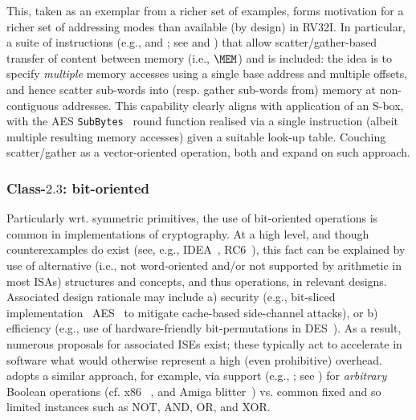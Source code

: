 This, taken as an exemplar from a richer set of examples, forms motivation
for a richer set of addressing modes than available (by design) in RV32I.
In particular, 
a suite of instructions 
(e.g.,  and ; see  and )
that allow 
scatter/gather-based
transfer of content between
   memory                         (i.e., $\MEM$)
and
is included: the idea is to specify {\em multiple} memory accesses using a
single base address and multiple offsets, and hence scatter sub-words into 
(resp. gather sub-words from) memory at non-contiguous addresses.  
This capability clearly aligns with application of an S-box, with the AES 
{\tt SubBytes}~\cite[Section 5.1.1]{SCARV:FIPS:197} 
round function realised via a single  instruction 
(albeit multiple resulting memory accesses) given a suitable look-up table.
Couching scatter/gather as a vector-oriented operation, both
\cite[Section 3.1]{SCARV:FouMoo:05} 
and 
\cite[Section 3.3]{SCARV:Fournier:07}
expand on such approach.


\subsubsection{Class-$2.3$: bit-oriented}
\label{sec:bg:feature:2:3}

Particularly wrt. symmetric primitives, the use of bit-oriented operations 
is common in implementations of cryptography.  At a high level, and though 
counterexamples do exist 
(see, e.g., IDEA~\cite{SCARV:LaiMas:90}, RC6~\cite{SCARV:RRSY:98}),
this fact can be explained by use of alternative (i.e., not word-oriented
and/or not supported by arithmetic in most ISAs) structures and concepts,
and thus operations, in relevant designs.  Associated design rationale may
include
a) security
   (e.g., bit-sliced implementation~\cite{SCARV:KasSch:09} AES~\cite{SCARV:FIPS:197} to mitigate cache-based side-channel attacks),
   or
b) efficiency
   (e.g., use of hardware-friendly bit-permutations in DES~\cite{SCARV:FIPS:46_3}).
As a result, numerous proposals for associated ISEs exist; these typically
act to accelerate in software what would otherwise represent a high (even 
prohibitive) overhead.  \XCRYPTO adopts a similar approach, for example, via
support
(e.g., ; see )
for {\em arbitrary} Boolean operations
(cf. x86 ~\cite[5-446--5-468]{SCARV:X86:2:18}, and Amiga blitter~\cite[Chapter 6]{SCARV:Amiga:85})
vs. common fixed and so limited instances such as NOT, AND, OR, and XOR.

